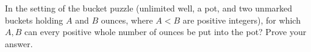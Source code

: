 In the setting of the bucket puzzle (unlimited well, a pot, and two unmarked buckets holding $A$ and $B$ ounces, where $A<B$ are positive integers), for which $A,B$ can every positive whole number of ounces be put into the pot? Prove your answer.
